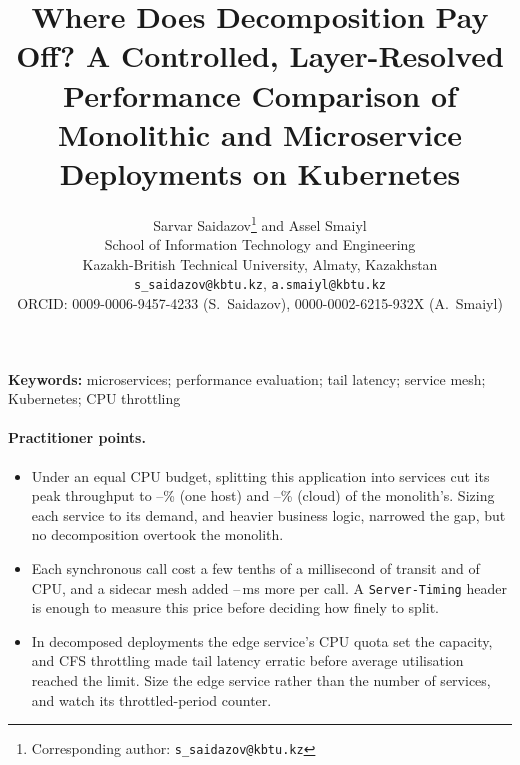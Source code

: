 \title{Where Does Decomposition Pay Off? A Controlled, Layer-Resolved Performance Comparison
of Monolithic and Microservice Deployments on Kubernetes}
\author{Sarvar Saidazov\thanks{Corresponding author: \texttt{s\_saidazov@kbtu.kz}}\hspace{0.4em} and Assel Smaiyl\\[2pt]
School of Information Technology and Engineering\\Kazakh-British Technical University, Almaty, Kazakhstan\\
\texttt{s\_saidazov@kbtu.kz}, \texttt{a.smaiyl@kbtu.kz}\\
ORCID: 0009-0006-9457-4233 (S.~Saidazov), 0000-0002-6215-932X (A.~Smaiyl)}
\date{}


\maketitle

\begin{abstract}

\end{abstract}

{\raggedright\noindent\textbf{Keywords:} microservices; performance evaluation; tail latency; service mesh;
Kubernetes; CPU throttling\par}

\paragraph{Practitioner points.}
\begin{itemize}
\item Under an equal CPU budget, splitting this application into services cut its peak throughput to
--\% (one host) and --\% (cloud) of the
monolith's. Sizing each service to its demand, and heavier business logic, narrowed the gap, but no decomposition
overtook the monolith.
\item Each synchronous call cost a few tenths of a millisecond of transit and of CPU, and a sidecar mesh added
--\,ms more per call. A \texttt{Server-Timing} header is enough to
measure this price before deciding how finely to split.
\item In decomposed deployments the edge service's CPU quota set the capacity, and CFS throttling made tail latency
erratic before average utilisation reached the limit. Size the edge service rather than the number of services,
and watch its throttled-period counter.
\end{itemize}

